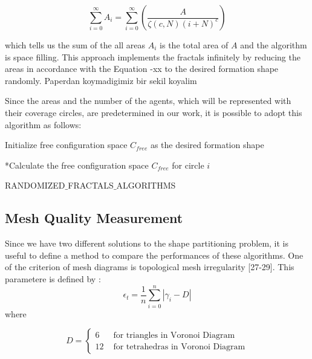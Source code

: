 \documentclass[twoside]{article}
\begin{document}
		\begin{equation}
		\sum_{i=0}^{\infty}A_i = \sum_{i = 0}^{\infty}\left(\frac{A}{\zeta(c,N)(i+N)^c}\right)
		\end{equation}
	
		which tells us the sum of the all areas $A_i$ is the total area of $A$ and the algorithm is space filling. This approach implements the fractals infinitely by reducing the areas in accordance with the Equation -xx to the desired formation shape randomly. 
		Paperdan koymadigimiz bir sekil koyalim
		
		Since the areas and the number of the agents, which will be represented with their coverage circles, are predetermined in our work, it is possible to adopt this algorithm as follows:
		
					\begin{algorithm}[H]
						
						Initialize free configuration space $C_{free}$ as the desired formation shape
						
						{		
							*Calculate the free configuration space $C_{free}$ for circle $i$\;
												
						}												
						
						\caption{RANDOMIZED$\_$FRACTALS$\_$ALGORITHMS}
					\end{algorithm}
	
	
	\subsection{Mesh Quality Measurement}
	Since we have two different solutions to the shape partitioning problem, it is useful to define a method to compare the performances of these algorithms. One of the criterion of mesh diagrams is topological mesh irregularity [27-29]. This parametere is defined by : 
	\begin{equation}
\epsilon _t = \frac{1}{n} \sum_{i = 0}^{n} |\gamma _i - D|
	\end{equation}
	where 
	
	
			\begin{equation}
			D = \left\{ \begin{array}{rl}
			6                               &\mbox{ for triangles in Voronoi Diagram} \\
			12                             &\mbox{ for tetrahedras in Voronoi Diagram}
			\end{array} \right.
			\end{equation}
	
\end{document}
